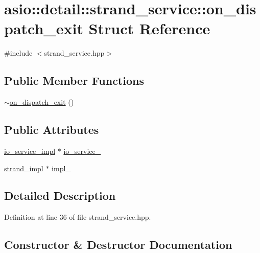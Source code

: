 \hypertarget{structasio_1_1detail_1_1strand__service_1_1on__dispatch__exit}{}\section{asio\+:\+:detail\+:\+:strand\+\_\+service\+:\+:on\+\_\+dispatch\+\_\+exit Struct Reference}
\label{structasio_1_1detail_1_1strand__service_1_1on__dispatch__exit}


{\ttfamily \#include $<$strand\+\_\+service.\+hpp$>$}

\subsection*{Public Member Functions}
\begin{DoxyCompactItemize}
\item 
\hyperlink{structasio_1_1detail_1_1strand__service_1_1on__dispatch__exit_ab59d1c9b77dd4261c1d7f1aa8490b4d4}{$\sim$on\+\_\+dispatch\+\_\+exit} ()
\end{DoxyCompactItemize}
\subsection*{Public Attributes}
\begin{DoxyCompactItemize}
\item 
\hyperlink{namespaceasio_1_1detail_a6d61d9b8e53c11288be549d82aec5a42}{io\+\_\+service\+\_\+impl} $\ast$ \hyperlink{structasio_1_1detail_1_1strand__service_1_1on__dispatch__exit_a46671ac362e866934893479b329ea4ff}{io\+\_\+service\+\_\+}
\item 
\hyperlink{classasio_1_1detail_1_1strand__service_1_1strand__impl}{strand\+\_\+impl} $\ast$ \hyperlink{structasio_1_1detail_1_1strand__service_1_1on__dispatch__exit_a5205330dc1024019a4236eb2712fe2b0}{impl\+\_\+}
\end{DoxyCompactItemize}


\subsection{Detailed Description}


Definition at line 36 of file strand\+\_\+service.\+hpp.



\subsection{Constructor \& Destructor Documentation}
\hypertarget{structasio_1_1detail_1_1strand__service_1_1on__dispatch__exit_ab59d1c9b77dd4261c1d7f1aa8490b4d4}{}
